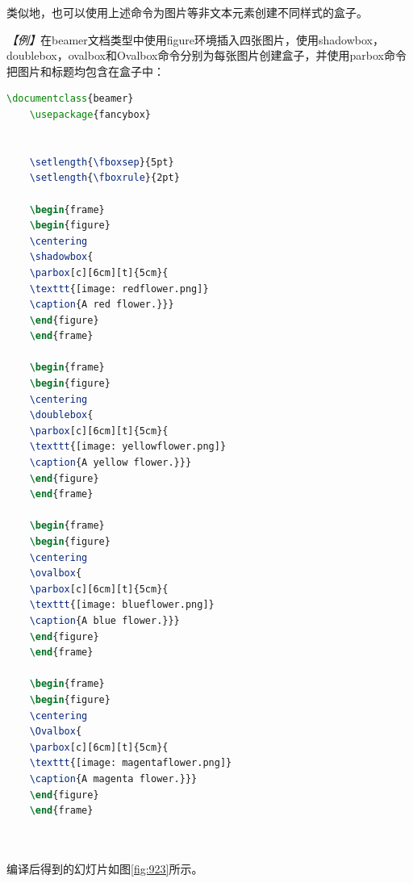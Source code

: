类似地，也可以使用上述命令为图片等非文本元素创建不同样式的盒子。

\emph{【例】}在beamer文档类型中使用figure环境插入四张图片，使用shadowbox，doublebox，ovalbox和Ovalbox命令分别为每张图片创建盒子，并使用parbox命令把图片和标题均包含在盒子中：
\begin{lstlisting}[language=TeX]
    \documentclass{beamer}
    \usepackage{fancybox}
    

    \setlength{\fboxsep}{5pt}
    \setlength{\fboxrule}{2pt}

    \begin{frame}
    \begin{figure}
    \centering
    \shadowbox{
    \parbox[c][6cm][t]{5cm}{
    \texttt{[image: redflower.png]}
    \caption{A red flower.}}}
    \end{figure}
    \end{frame}

    \begin{frame}
    \begin{figure}
    \centering
    \doublebox{
    \parbox[c][6cm][t]{5cm}{
    \texttt{[image: yellowflower.png]}
    \caption{A yellow flower.}}}
    \end{figure}
    \end{frame}

    \begin{frame}
    \begin{figure}
    \centering
    \ovalbox{
    \parbox[c][6cm][t]{5cm}{
    \texttt{[image: blueflower.png]}
    \caption{A blue flower.}}}
    \end{figure}
    \end{frame}

    \begin{frame}
    \begin{figure}
    \centering
    \Ovalbox{
    \parbox[c][6cm][t]{5cm}{
    \texttt{[image: magentaflower.png]}
    \caption{A magenta flower.}}}
    \end{figure}
    \end{frame}

    
\end{lstlisting}

编译后得到的幻灯片如图\ref{fig:923}所示。

